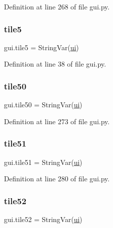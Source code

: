 Definition at line 268 of file gui.\+py.

\mbox{\label{namespacegui_a9ed659ae603b4cb1b13bec5703143c39}} 
\subsubsection{\texorpdfstring{tile5}{tile5}}
{\footnotesize\ttfamily gui.\+tile5 = String\+Var(\mbox{\hyperlink{namespacegui_a40ab7281456eadbea2dc2038f5c24fa1}{ui}})}



Definition at line 38 of file gui.\+py.

\mbox{\label{namespacegui_aaaa7bd00c74fe95ffd396a2280fe1bcd}} 
\subsubsection{\texorpdfstring{tile50}{tile50}}
{\footnotesize\ttfamily gui.\+tile50 = String\+Var(\mbox{\hyperlink{namespacegui_a40ab7281456eadbea2dc2038f5c24fa1}{ui}})}



Definition at line 273 of file gui.\+py.

\mbox{\label{namespacegui_ad2c1b5064cba842f7abd0322229ca355}} 
\subsubsection{\texorpdfstring{tile51}{tile51}}
{\footnotesize\ttfamily gui.\+tile51 = String\+Var(\mbox{\hyperlink{namespacegui_a40ab7281456eadbea2dc2038f5c24fa1}{ui}})}



Definition at line 280 of file gui.\+py.

\mbox{\label{namespacegui_a0a21b48dd64e7d0944745635aa9d8c8b}} 
\subsubsection{\texorpdfstring{tile52}{tile52}}
{\footnotesize\ttfamily gui.\+tile52 = String\+Var(\mbox{\hyperlink{namespacegui_a40ab7281456eadbea2dc2038f5c24fa1}{ui}})}



